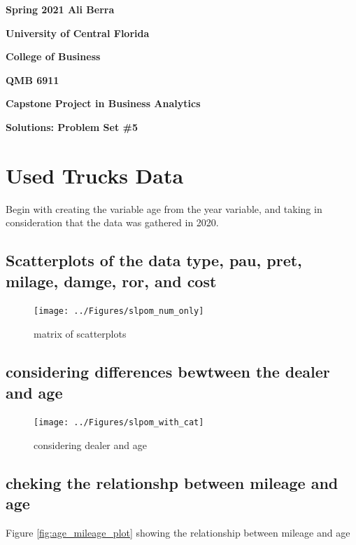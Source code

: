 \documentclass[11pt]{book}
\begin{document}

\pagestyle{empty}
{\noindent\bf Spring 2021 \hfill Ali Berra}
\vskip 16pt
\centerline{\bf University of Central Florida}
\centerline{\bf College of Business}
\vskip 16pt
\centerline{\bf QMB 6911}
\centerline{\bf Capstone Project in Business Analytics}
\vskip 10pt
\centerline{\bf Solutions:  Problem Set \#5}
\vskip 32pt
\noindent




\section{Used Trucks Data}

Begin with creating the variable age from the year variable, and taking in consideration that the data was gathered in 2020.

\subsection{Scatterplots of the data type, pau, pret, milage, damge, ror, and cost}

 
%
\begin{figure}[h!]
  \centering
  \texttt{[image: ../Figures/slpom\_num\_only]}
  \caption{matrix of scatterplots} \label{fig:splom_num_only}
\end{figure}


\clearpage
\pagebreak
\subsection{considering differences bewtween the dealer and age}




\begin{figure}[h!]
  \centering
  \texttt{[image: ../Figures/slpom\_with\_cat]}
  \caption{considering dealer and age} \label{fig:splom_with_cat}
\end{figure}


\clearpage
\pagebreak



\subsection*{cheking the relationshp between mileage and age }


Figure \ref{fig:age_mileage_plot} showing the relationship between mileage and age 
\end{document}
